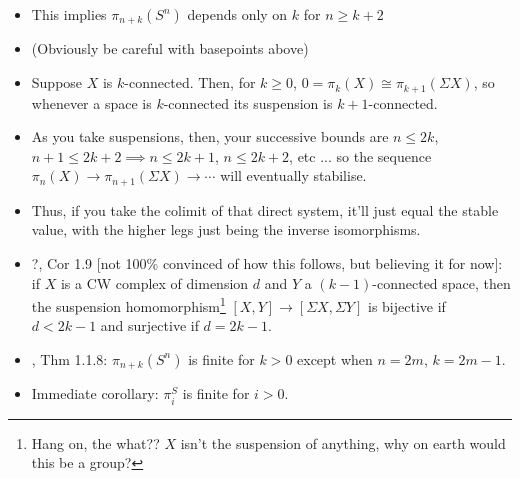 \documentclass{MetricNotes2023}
\begin{document}
\begin{itemize}
\item This implies \(\pi_{n+k}(S^n)\) depends only on \(k\) for \(n\geq k+2\)
\item (Obviously be careful with basepoints above)
\item Suppose \(X\) is \(k\)-connected. Then, for \(k\geq 0\), \(0=\pi_k(X)\cong \pi_{k+1}(\Sigma X)\), so whenever a space is \(k\)-connected its suspension is \(k+1\)-connected. 
\item As you take suspensions, then, your successive bounds are \(n \leq 2k\), \(n+1\leq 2k+2\implies n \leq 2k+1\), \(n\leq 2k+2\), etc ... so the sequence \(\pi_n(X)\to \pi_{n+1}(\Sigma X)\to \cdots\) will eventually stabilise.  
\item Thus, if you take the colimit of that direct system, it'll just equal the stable value, with the higher legs just being the inverse isomorphisms.
\item ?\autocite{ass}, Cor 1.9 [not 100\% convinced of how this follows, but believing it for now]: if \(X\) is a CW complex of dimension \(d\) and \(Y\) a \((k-1)\)-connected space, then the suspension homomorphism\footnote{Hang on, the what?? \(X\) isn't the suspension of anything, why on earth would this be a group?} \([X, Y]\to[\Sigma X, \Sigma Y]\) is bijective if \(d<2k-1\) and surjective if \(d=2k-1\). 

\item \autocite{cobordism}, Thm 1.1.8: \(\pi_{n+k}(S^n)\) is finite for \(k>0\) except when \(n=2m\), \(k=2m-1\). 

\item Immediate corollary: \(\pi_i^S\) is finite for \(i>0\). 
\end{itemize}
\end{document}
